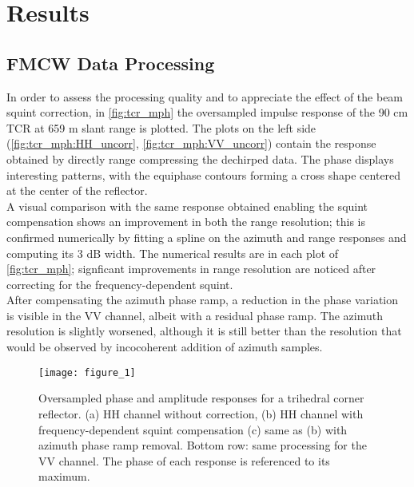 \section{Results}\label{sec:results}
\subsection{FMCW Data Processing}\label{sec:res_SLC}
In order to assess the processing quality and to appreciate the effect of the beam squint correction, in  \autoref{fig:tcr_mph} the oversampled impulse response of the 90 cm TCR at 659 m slant range is plotted. The plots on the left side (\autoref{fig:tcr_mph:HH_uncorr}, \autoref{fig:tcr_mph:VV_uncorr}) contain the response obtained by directly range compressing the dechirped data. The phase displays interesting patterns, with the equiphase contours forming a cross shape centered at the center of the reflector.\\ A visual comparison with the same response obtained enabling the squint compensation shows an improvement in both the range resolution; this is confirmed numerically by fitting a spline on the azimuth and range responses and computing its 3 dB width. The numerical results are in each plot of \autoref{fig:tcr_mph}; signficant improvements in range resolution are noticed after correcting for the frequency-dependent squint.\\ After compensating the azimuth phase ramp, a reduction in the phase variation is visible in the VV channel, albeit with a residual phase ramp. The azimuth resolution is slightly worsened, although it is still better than the resolution that would be observed by incocoherent addition of azimuth samples.
\def\chutzepref{20160914_145059}
\begin{figure*}[ht]
	\centering
	\texttt{[image: figure\_1]}
	\caption{Oversampled phase and amplitude responses for a trihedral corner reflector. (a) HH channel without correction, (b) HH channel with frequency-dependent squint compensation (c) same as (b) with azimuth phase ramp removal. Bottom row: same processing for the VV channel.
	The phase of each response is referenced to its maximum.}
	\label{fig:tcr_mph}
\end{figure*}
